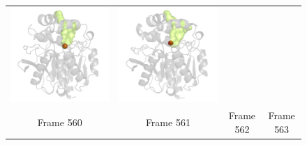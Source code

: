 \documentclass[usletter, 10pt, conference]{svjour3}      %
\begin{document}
\begin{figure}
{\begin{tabular}{cccc}
\includegraphics[width=\ee\textwidth]{fig/video-0562} &
\includegraphics[width=\ee\textwidth]{fig/video-0563}  \\
Frame 560 & Frame 561 & Frame 562 & Frame 563 \\                       

\end{tabular}}
\end{figure}
\end{document}
